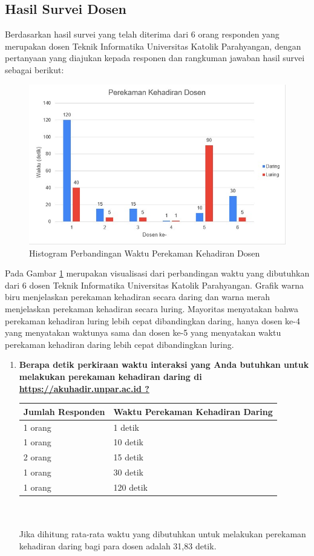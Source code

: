 \documentclass[a4paper,twoside]{article}
\begin{document}
\begin{enumerate}
		\subsection{Hasil Survei Dosen}
		Berdasarkan hasil survei yang telah diterima dari 6 orang responden yang merupakan dosen Teknik Informatika Universitas Katolik Parahyangan, dengan pertanyaan yang diajukan kepada responen dan rangkuman jawaban hasil survei sebagai berikut:
		\begin{figure}[H]
			\centering
			\includegraphics[scale=0.8]{Gambar/GrafikDosen.jpg}
			\caption{Histogram Perbandingan Waktu Perekaman Kehadiran Dosen} 
			\label{fig:GrafikDosen}
		\end{figure}
		Pada Gambar \ref{fig:GrafikDosen} merupakan visualisasi dari perbandingan waktu yang dibutuhkan dari 6 dosen Teknik Informatika Universitas Katolik Parahyangan. Grafik warna biru menjelaskan perekaman kehadiran secara daring dan warna merah menjelaskan perekaman kehadiran secara luring. Mayoritas menyatakan bahwa perekaman kehadiran luring lebih cepat dibandingkan daring, hanya dosen ke-4 yang menyatakan waktunya sama dan dosen ke-5 yang menyatakan waktu perekaman kehadiran daring lebih cepat dibandingkan luring.
		\begin{enumerate}
			\item \textbf{Berapa detik perkiraan waktu interaksi yang Anda butuhkan untuk melakukan perekaman kehadiran daring di \url{https://akuhadir.unpar.ac.id ?}}\\
			\begin{tabular}{|p{4cm} |p{7cm}|}
				\hline
				Jumlah Responden &  Waktu Perekaman Kehadiran Daring \\ \hline     
				1 orang &  1 detik\\ \hline 
				1 orang &  10 detik\\ \hline 
				2 orang &  15 detik\\ \hline 
				1 orang &  30 detik\\ \hline 
				1 orang &  120 detik\\ \hline 
			\end{tabular}\\ \\
			Jika dihitung rata-rata waktu yang dibutuhkan untuk melakukan perekaman kehadiran daring bagi para dosen adalah 31,83 detik.
		

\end{enumerate}
\end{enumerate}
\end{document}
